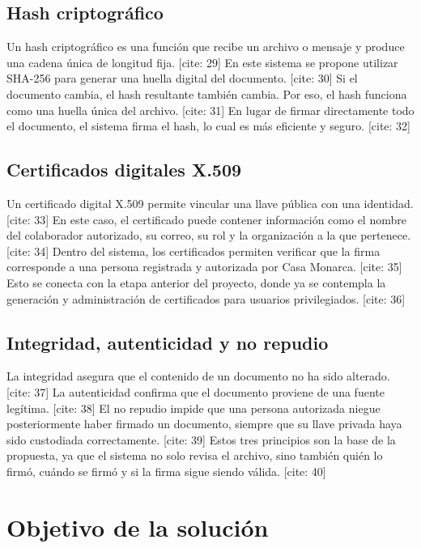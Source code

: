 \documentclass[10pt]{article} [cite: 1]
\begin{document}
\subsection{Hash criptográfico}

Un hash criptográfico es una función que recibe un archivo o mensaje y produce una cadena única de longitud fija. [cite: 29] En este sistema se propone utilizar SHA-256 para generar una huella digital del documento. [cite: 30] Si el documento cambia, el hash resultante también cambia. Por eso, el hash funciona como una huella única del archivo. [cite: 31] En lugar de firmar directamente todo el documento, el sistema firma el hash, lo cual es más eficiente y seguro. [cite: 32]

\subsection{Certificados digitales X.509}

Un certificado digital X.509 permite vincular una llave pública con una identidad. [cite: 33] En este caso, el certificado puede contener información como el nombre del colaborador autorizado, su correo, su rol y la organización a la que pertenece. [cite: 34] Dentro del sistema, los certificados permiten verificar que la firma corresponde a una persona registrada y autorizada por Casa Monarca. [cite: 35] Esto se conecta con la etapa anterior del proyecto, donde ya se contempla la generación y administración de certificados para usuarios privilegiados. [cite: 36]

\subsection{Integridad, autenticidad y no repudio}

La integridad asegura que el contenido de un documento no ha sido alterado. [cite: 37] La autenticidad confirma que el documento proviene de una fuente legítima. [cite: 38] El no repudio impide que una persona autorizada niegue posteriormente haber firmado un documento, siempre que su llave privada haya sido custodiada correctamente. [cite: 39] Estos tres principios son la base de la propuesta, ya que el sistema no solo revisa el archivo, sino también quién lo firmó, cuándo se firmó y si la firma sigue siendo válida. [cite: 40]

\section{Objetivo de la solución}
\end{document}
